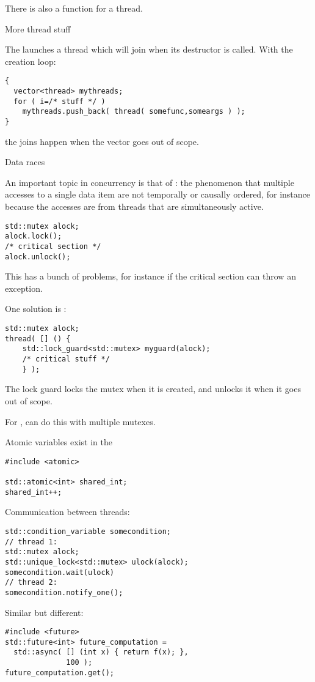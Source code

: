 There is also a  function for a thread.

 {More thread stuff}

The   launches a thread
which will join when its destructor is called.
With the creation loop:
\begin{lstlisting}
{
  vector<thread> mythreads;
  for ( i=/* stuff */ )
    mythreads.push_back( thread( somefunc,someargs ) );
}
\end{lstlisting}
the joins happen when the vector goes out of scope.

 {Data races}

An important topic in concurrency is that of
:
the phenomenon that multiple accesses to a single data item
are not temporally or causally ordered,
for instance because the accesses are from threads
that are simultaneously active.

\begin{lstlisting}
std::mutex alock;
alock.lock();
/* critical section */
alock.unlock();
\end{lstlisting}
This has a bunch of problems, for instance if the critical section can throw
an exception.

One solution is :
\begin{lstlisting}
std::mutex alock;
thread( [] () {
    std::lock_guard<std::mutex> myguard(alock);
    /* critical stuff */
    } );
\end{lstlisting}
The lock guard locks the mutex when it is created,
and unlocks it when it goes out of scope.

For , 
can do this with multiple mutexes.

Atomic variables exist in the 
\begin{lstlisting}
#include <atomic>
  
std::atomic<int> shared_int;
shared_int++;
\end{lstlisting}

Communication between threads:
\begin{lstlisting}
std::condition_variable somecondition;
// thread 1:
std::mutex alock;
std::unique_lock<std::mutex> ulock(alock);
somecondition.wait(ulock)
// thread 2:
somecondition.notify_one();
\end{lstlisting}

Similar but different:
\begin{lstlisting}
#include <future>
std::future<int> future_computation =
  std::async( [] (int x) { return f(x); },
              100 );
future_computation.get();
\end{lstlisting}

